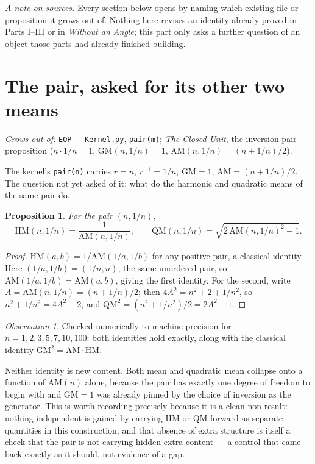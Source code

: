 \documentclass[10pt,a4paper]{article}
\theoremstyle{plain}
\newtheorem{proposition}{Proposition}
\theoremstyle{definition}
\theoremstyle{remark}
\newtheorem{observation}{Observation}
\begin{document}
\vspace{0.9em}
\noindent
\textit{A note on sources.}
Every section below opens by naming which existing file or proposition it grows out of. Nothing here revises an identity already proved in Parts I--III or in \emph{Without an Angle}; this part only asks a further question of an object those parts had already finished building.

\newpage
\tableofcontents
\newpage

\section{The pair, asked for its other two means}
\label{sec:hmqm}

\emph{Grows out of:} \texttt{EOP -- Kernel.py}, \texttt{pair(m)}; \emph{The Closed Unit}, the inversion-pair proposition ($n\cdot1/n=1$, $\mathrm{GM}(n,1/n)=1$, $\mathrm{AM}(n,1/n)=(n+1/n)/2$).

The kernel's \texttt{pair(n)} carries $r=n$, $r^{-1}=1/n$, $\mathrm{GM}=1$, $\mathrm{AM}=(n+1/n)/2$. The question not yet asked of it: what do the harmonic and quadratic means of the same pair do.

\begin{proposition}
\label{prop:hmqm}
For the pair $(n,1/n)$,
\[
\mathrm{HM}(n,1/n)=\frac{1}{\mathrm{AM}(n,1/n)},\qquad
\mathrm{QM}(n,1/n)=\sqrt{2\,\mathrm{AM}(n,1/n)^{2}-1}.
\]
\end{proposition}

\begin{proof}
$\mathrm{HM}(a,b)=1/\mathrm{AM}(1/a,1/b)$ for any positive pair, a classical identity. Here $(1/a,1/b)=(1/n,n)$, the same unordered pair, so $\mathrm{AM}(1/a,1/b)=\mathrm{AM}(a,b)$, giving the first identity. For the second, write $A=\mathrm{AM}(n,1/n)=(n+1/n)/2$; then $4A^{2}=n^{2}+2+1/n^{2}$, so $n^{2}+1/n^{2}=4A^{2}-2$, and $\mathrm{QM}^{2}=(n^{2}+1/n^{2})/2=2A^{2}-1$.
\end{proof}

\begin{observation}
Checked numerically to machine precision for $n=1,2,3,5,7,10,100$: both identities hold exactly, along with the classical identity $\mathrm{GM}^{2}=\mathrm{AM}\cdot\mathrm{HM}$.
\end{observation}

Neither identity is new content. Both mean and quadratic mean collapse onto a function of $\mathrm{AM}(n)$ alone, because the pair has exactly one degree of freedom to begin with and $\mathrm{GM}=1$ was already pinned by the choice of inversion as the generator. This is worth recording precisely because it is a clean non-result: nothing independent is gained by carrying $\mathrm{HM}$ or $\mathrm{QM}$ forward as separate quantities in this construction, and that absence of extra structure is itself a check that the pair is not carrying hidden extra content --- a control that came back exactly as it should, not evidence of a gap.
\end{document}
